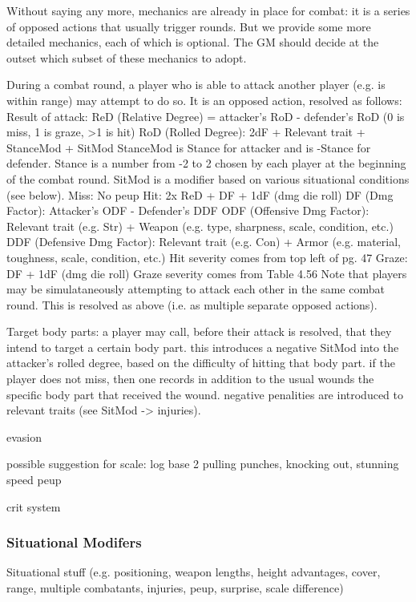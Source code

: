 \documentclass[12pt]{article}
\newcommand{\notes}[1]{{\color{Tan} #1}}
\begin{document}
Without saying any more, mechanics are already in place for combat:
it is a series of opposed actions that usually trigger rounds.
But we provide some more detailed mechanics, each of which is optional.
The GM should decide at the outset which subset of these mechanics to adopt.

\notes{

	During a combat round, a player who is able to attack another player (e.g. is within range) may attempt to do so.
	It is an opposed action, resolved as follows:
		Result of attack: ReD (Relative Degree) = attacker's RoD - defender's RoD (0 is miss, 1 is graze, >1 is hit)
			RoD (Rolled Degree): 2dF + Relevant trait + StanceMod + SitMod
				StanceMod is Stance for attacker and is -Stance for defender.
					Stance is a number from -2 to 2 chosen by each player at the beginning of the combat round.
				SitMod is a modifier based on various situational conditions (see below).
		Miss: No peup
		Hit: 2x ReD + DF + 1dF (dmg die roll)
			DF (Dmg Factor): Attacker's ODF - Defender's DDF
				ODF (Offensive Dmg Factor): Relevant trait (e.g. Str) + Weapon (e.g. type, sharpness, scale, condition, etc.)
				DDF (Defensive Dmg Factor): Relevant trait (e.g. Con) + Armor (e.g. material, toughness, scale, condition, etc.)
			Hit severity comes from top left of pg. 47
		Graze: DF + 1dF (dmg die roll)
			Graze severity comes from Table 4.56
	Note that players may be simulataneously attempting to attack each other in the same combat round.
	This is resolved as above (i.e. as multiple separate opposed actions).

Target body parts:
a player may call, before their attack is resolved, that they intend to target a certain body part.
this introduces a negative SitMod into the attacker's rolled degree, based on the difficulty of hitting that body part.
if the player does not miss, then one records in addition to the usual wounds the specific body part that received the wound.
negative penalities are introduced to relevant traits (see SitMod -> injuries).

evasion

	possible suggestion for scale: log base 2
pulling punches, knocking out, stunning
speed
peup

crit system
}

\subsubsection{Situational Modifers}
\notes{Situational stuff (e.g. positioning, weapon lengths, height advantages, cover, range, multiple combatants, injuries, peup, surprise, scale difference)}
\end{document}
